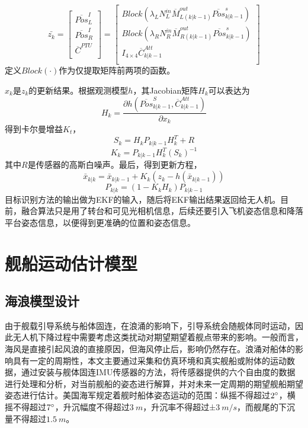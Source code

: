\begin{equation}
\bar{z_k}=
\left[
\begin{matrix}
\overline{Pos}^I_L \\
\overline{Pos}^I_R \\
\overline{C}^{PTU} \\
\end{matrix}
\right]
=
\left[
\begin{matrix}
Block (\lambda_L N^{in}_L \overline{M}^{out}_{L(k|k-1)}\overline{Pos}^s_{k|k-1} )\\
Block (\lambda_R N^{in}_R\overline{M}^{out}_{R(k|k-1)}\overline{Pos}^s_{k|k-1}  )\\
I_{4 \times 4}\overline{C}^{Att}_{k|k-1} \\
\end{matrix}
\right]
\end{equation}
定义$Block(\cdot)$作为仅提取矩阵前两项的函数。

$x_k$是$z_k$的更新结果。根据观测模型$h$，其Jacobian矩阵$H_k$可以表达为
\begin{equation}
H_k=\frac{\partial h ( \overline{Pos}^S_{k|k-1}, \overline{C}^{Att}_{k|k-1} )}{\partial x_k} 
\end{equation}
得到卡尔曼增益$K_t$，
\begin{equation}
S_k=H_k P_{k|k-1} H^T_k + R
\end{equation}
\begin{equation}
K_k=P_{k|k-1}H^T_k(S_k)^{-1}
\end{equation}
其中$R$是传感器的高斯白噪声。最后，得到更新方程，
\begin{equation}
\bar{x}_{k|k} = \bar{x}_{k|k-1}+K_k(z_k-h(\bar{x}_{k|k-1}))
\end{equation}
\begin{equation}
P_{k|k}=(1-K_k H_k)P_{k|k-1}
\end{equation}
目标识别方法的输出做为EKF的输入，随后将EKF输出结果返回给无人机。目前，融合算法只是用了转台和可见光相机信息，后续还要引入飞机姿态信息和降落平台姿态信息，以便得到更准确的位置和姿态信息。

\section{舰船运动估计模型}
\subsection{海浪模型设计}
由于舰载引导系统与船体固连，在浪涌的影响下，引导系统会随舰体同时运动，因此无人机下降过程中需要考虑这类扰动对期望期望着舰点带来的影响。一般而言，海风是直接引起风浪的直接原因，但海风停止后，影响仍然存在。浪涌对船体的影响具有一定的周期性，本文主要通过采集和仿真环境和真实舰船或附体的运动数据，通过安装与舰体固连IMU传感器的方法，将传感器提供的六个自由度的数据进行处理和分析，对当前舰船的姿态进行解算，并对未来一定周期的期望舰船期望姿态进行估计。美国海军规定着舰时船体姿态运动的范围：纵摇不得超过$2\degree$，横摇不得超过$7\degree$，升沉幅度不得超过$3\ m$，升沉率不得超过±$3\ m/s$，而舰尾的下沉量不得超过$1.5\ m$。

